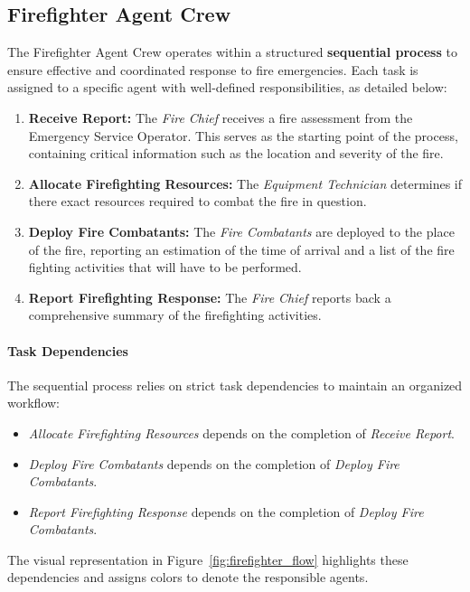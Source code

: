 \subsection{Firefighter Agent Crew}

The Firefighter Agent Crew operates within a structured \textbf{sequential process} to ensure effective and coordinated response to fire emergencies. Each task is assigned to a specific agent with well-defined responsibilities, as detailed below:

\begin{enumerate}
    \item \textbf{Receive Report:} The \textit{Fire Chief} receives a fire assessment from the Emergency Service Operator. This serves as the starting point of the process, containing critical information such as the location and severity of the fire.
    \item \textbf{Allocate Firefighting Resources:} The \textit{Equipment Technician} determines if there exact resources required to combat the fire in question.
	\item \textbf{Deploy Fire Combatants:} The \textit{Fire Combatants} are deployed to the place of the fire, reporting an estimation of the time of arrival and a list of the fire fighting activities that will have to be performed.
	\item \textbf{Report Firefighting Response:} The \textit{Fire Chief} reports back a comprehensive summary of the firefighting activities.
\end{enumerate}

\paragraph{Task Dependencies}
The sequential process relies on strict task dependencies to maintain an organized workflow:
\begin{itemize}
    \item \textit{Allocate Firefighting Resources} depends on the completion of \textit{Receive Report}.
    \item \textit{Deploy Fire Combatants} depends on the completion of \textit{Deploy Fire Combatants}.
    \item \textit{Report Firefighting Response} depends on the completion of \textit{Deploy Fire Combatants}.
\end{itemize}

The visual representation in Figure~\ref{fig:firefighter_flow} highlights these dependencies and assigns colors to denote the responsible agents.


